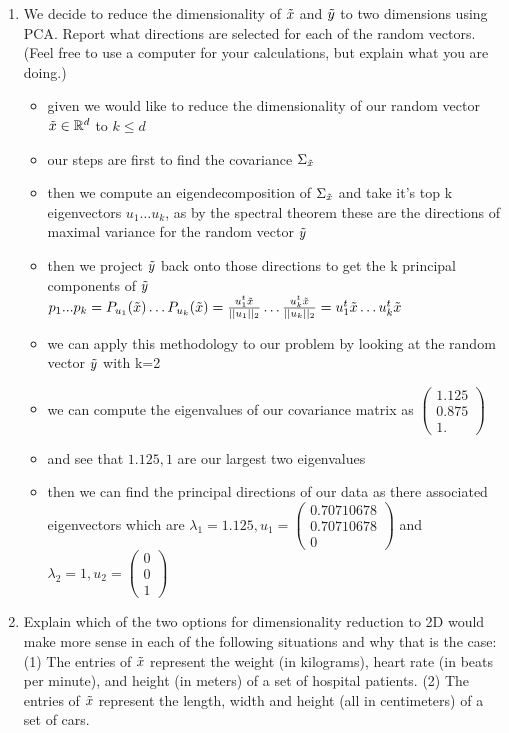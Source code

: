 \documentclass[12pt,twoside]{article}
\begin{document}
\begin{enumerate}
\begin{enumerate}
\item We decide to reduce the dimensionality of $\tilde{  x }$ and $\tilde{  y }$ to two dimensions using PCA. Report what directions are selected for each of the random vectors. (Feel free to use a computer for your calculations, but explain what you are doing.)  
\begin{itemize}
  \color{blue}
  \item given we would like to reduce the dimensionality of our random vector $\Tilde{x}\in \mathbb{R}^{d}$ to $k\leq d$
  \item our steps are first to find the covariance $\Sigma_{\Tilde{x}}$
  \item then we compute an eigendecomposition of $\Sigma_{\Tilde{x}}$ and take it's top k eigenvectors $u_1\dots u_k$, as by the spectral theorem these are the directions of maximal variance for the random vector $\Tilde{y}$
  \item then we project $\Tilde{y}$ back onto those directions to get the k principal components of $\Tilde{y}$ $p_1...p_k=P_{u_1}(\Tilde{x})\dots P_{u_k}(\Tilde{x})=\frac{u_1^{t}\Tilde{x}}{||u_1||_2}\dots \frac{u_k^{t}\Tilde{x}}{||u_k||_2}=u_1^{t}\Tilde{x}\dots u_k^{t}\Tilde{x}$
  \item we can apply this methodology to our problem by looking at the random vector $\Tilde{y}$ with k=2
  \item we can compute the eigenvalues of our covariance matrix as $\begin{pmatrix}
    1.125\\ 0.875\\ 1.  
  \end{pmatrix} $
  \item  and see that $1.125, 1$ are our largest two eigenvalues
  \item then we can find the principal directions of our data as there associated eigenvectors
  which are $\lambda_1=1.125, u_1=\begin{pmatrix}
    0.70710678 \\0.70710678 \\0
  \end{pmatrix}$ and $\lambda_2=1, u_2=\begin{pmatrix}
    0 \\0 \\1
  \end{pmatrix}$
\end{itemize}
\item Explain which of the two options for dimensionality reduction to 2D would make more sense in each of the following situations and why that is the case: (1) The entries of $\tilde{  x }$ represent the weight (in kilograms), heart rate (in beats per minute), and height (in meters) of a set of hospital patients. (2) The entries of $\tilde{  x }$ represent the length, width and height (all in centimeters) of a set of cars.  


\end{enumerate}
\end{enumerate}
\end{document}
